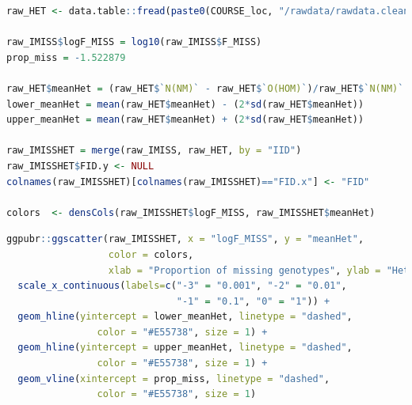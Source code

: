 \documentclass[
]{book}
\begin{document}
\begin{lstlisting}[language=R]
raw_HET <- data.table::fread(paste0(COURSE_loc, "/rawdata/rawdata.clean.ultraclean.het"))

raw_IMISS$logF_MISS = log10(raw_IMISS$F_MISS)
prop_miss = -1.522879

raw_HET$meanHet = (raw_HET$`N(NM)` - raw_HET$`O(HOM)`)/raw_HET$`N(NM)`
lower_meanHet = mean(raw_HET$meanHet) - (2*sd(raw_HET$meanHet))
upper_meanHet = mean(raw_HET$meanHet) + (2*sd(raw_HET$meanHet))

raw_IMISSHET = merge(raw_IMISS, raw_HET, by = "IID")
raw_IMISSHET$FID.y <- NULL
colnames(raw_IMISSHET)[colnames(raw_IMISSHET)=="FID.x"] <- "FID"

colors  <- densCols(raw_IMISSHET$logF_MISS, raw_IMISSHET$meanHet)
\end{lstlisting}

\begin{lstlisting}[language=R]
ggpubr::ggscatter(raw_IMISSHET, x = "logF_MISS", y = "meanHet",
                  color = colors,
                  xlab = "Proportion of missing genotypes", ylab = "Heterozygosity rate") +
  scale_x_continuous(labels=c("-3" = "0.001", "-2" = "0.01",
                              "-1" = "0.1", "0" = "1")) +
  geom_hline(yintercept = lower_meanHet, linetype = "dashed",
                color = "#E55738", size = 1) +
  geom_hline(yintercept = upper_meanHet, linetype = "dashed",
                color = "#E55738", size = 1) +
  geom_vline(xintercept = prop_miss, linetype = "dashed",
                color = "#E55738", size = 1)
\end{lstlisting}
\end{document}
